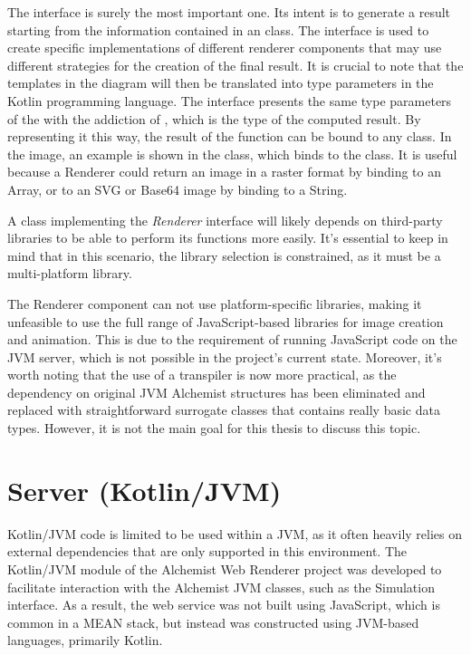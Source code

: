 The  interface is surely the most important one. Its intent is to generate a result starting from the information contained in an  class. The interface is used to create specific implementations of different renderer components that may use different strategies for the creation of the final result. It is crucial to note that the templates in the diagram will then be translated into type parameters in the Kotlin programming language. The  interface presents the same type parameters of the  with the addiction of , which is the type of the computed result.
By representing it this way, the result of the  function can be bound to any class. In the image, an example is shown in the  class, which binds  to the  class. It is useful because a Renderer could return an image in a raster format by binding  to an Array, or to an SVG or Base64 image by binding  to a String.\newline

A class implementing the \textit{Renderer} interface will likely depends on third-party libraries to be able to perform its functions more easily. It's essential to keep in mind that in this scenario, the library selection is constrained, as it must be a multi-platform library.

\begin{info}[Note:]
	The Renderer component can not use platform-specific libraries, making it unfeasible to use the full range of JavaScript-based libraries for image creation and animation. This is due to the requirement of running JavaScript code on the JVM server, which is not possible in the project's current state. Moreover, it's worth noting that the use of a transpiler is now more practical, as the dependency on original JVM Alchemist structures has been eliminated and replaced with straightforward surrogate classes that contains really basic data types. However, it is not the main goal for this thesis to discuss this topic.
\end{info}
\section{Server (Kotlin/JVM)}
\label{sec:server-kotlin-jvm}
Kotlin/JVM code is limited to be used within a JVM, as it often heavily relies on external dependencies that are only supported in this environment. The Kotlin/JVM module of the Alchemist Web Renderer project was developed to facilitate interaction with the Alchemist JVM classes, such as the Simulation interface. As a result, the web service was not built using JavaScript, which is common in a MEAN stack, but instead was constructed using JVM-based languages, primarily Kotlin.
